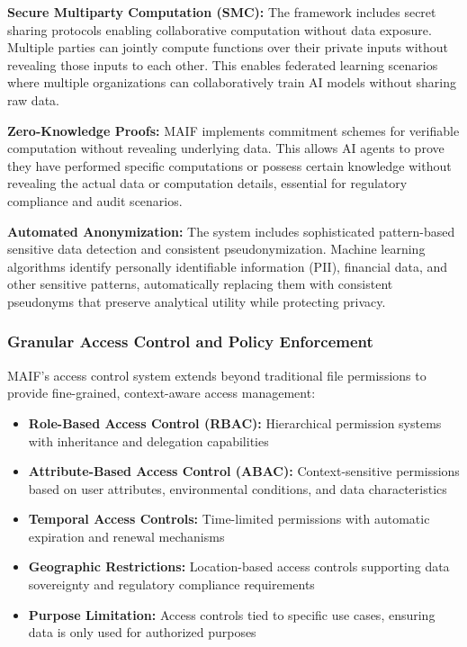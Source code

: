 \documentclass[conference]{IEEEtran}
\begin{document}
\textbf{Secure Multiparty Computation (SMC):} The framework includes secret sharing protocols enabling collaborative computation without data exposure. Multiple parties can jointly compute functions over their private inputs without revealing those inputs to each other. This enables federated learning scenarios where multiple organizations can collaboratively train AI models without sharing raw data.

\textbf{Zero-Knowledge Proofs:} MAIF implements commitment schemes for verifiable computation without revealing underlying data. This allows AI agents to prove they have performed specific computations or possess certain knowledge without revealing the actual data or computation details, essential for regulatory compliance and audit scenarios.

\textbf{Automated Anonymization:} The system includes sophisticated pattern-based sensitive data detection and consistent pseudonymization. Machine learning algorithms identify personally identifiable information (PII), financial data, and other sensitive patterns, automatically replacing them with consistent pseudonyms that preserve analytical utility while protecting privacy.

\subsubsection{Granular Access Control and Policy Enforcement}

MAIF's access control system extends beyond traditional file permissions to provide fine-grained, context-aware access management:

\begin{itemize}[leftmargin=*]
\item \textbf{Role-Based Access Control (RBAC):} Hierarchical permission systems with inheritance and delegation capabilities
\item \textbf{Attribute-Based Access Control (ABAC):} Context-sensitive permissions based on user attributes, environmental conditions, and data characteristics
\item \textbf{Temporal Access Controls:} Time-limited permissions with automatic expiration and renewal mechanisms
\item \textbf{Geographic Restrictions:} Location-based access controls supporting data sovereignty and regulatory compliance requirements
\item \textbf{Purpose Limitation:} Access controls tied to specific use cases, ensuring data is only used for authorized purposes
\end{itemize}
\end{document}
